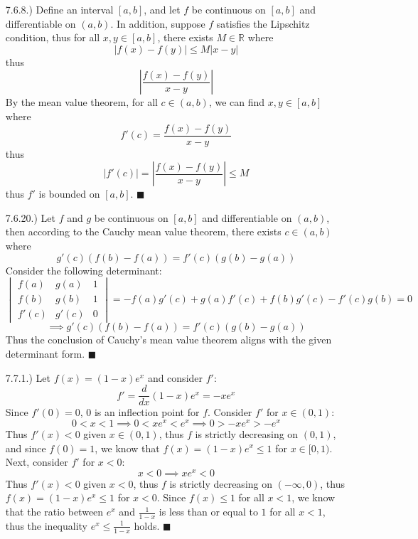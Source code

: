 \documentclass[11pt]{article}
\newcommand{\vertb}[1]{\left\vert#1\right\vert}      %
\newcommand{\parens}[1]{\left(#1\right)}             %
\newcommand{\R}{\mathbb{R}}
\newcommand{\derv}[2]{\dfrac{d#1}{d#2}}
\begin{document}
\pagestyle{fancy}
\fancyhead{}

\normalsize

\begin{itemize}
    \item [7.6.8.)] Define an interval $[a,b]$, and let $f$ be continuous on $[a,b]$ and differentiable on $(a,b)$. In addition, suppose $f$ satisfies the Lipschitz condition, thus for all $x,y\in[a,b]$, there exists $M\in\R$ where
    \[\vertb{f(x)-f(y)}\leq M\vertb{x-y}\]
    thus
    \[\vertb{\frac{f(x)-f(y)}{x-y}}\]
    By the mean value theorem, for all $c\in(a,b)$, we can find $x,y\in[a,b]$ where
    \[f'(c)=\frac{f(x)-f(y)}{x-y}\]
    thus
    \[\vertb{f'(c)}=\vertb{\frac{f(x)-f(y)}{x-y}}\leq M\]
    thus $f'$ is bounded on $[a,b]$. $\blacksquare$

    \item [7.6.20.)] Let $f$ and $g$ be continuous on $[a,b]$ and differentiable on $(a,b)$, then according to the Cauchy mean value theorem, there exists $c\in(a,b)$ where
    \[g'(c)(f(b)-f(a))=f'(c)(g(b)-g(a))\]
    Consider the following determinant:
    \[\begin{vmatrix*}
        f(a) & g(a) & 1 \\
        f(b) & g(b) & 1 \\
        f'(c) & g'(c) & 0
    \end{vmatrix*}=-f(a)g'(c)+g(a)f'(c)+f(b)g'(c)-f'(c)g(b)=0\]
    \[\implies g'(c)\parens{f(b)-f(a)}=f'(c)(g(b)-g(a))\]
    Thus the conclusion of Cauchy's mean value theorem aligns with the given determinant form. $\blacksquare$

    \item [7.7.1.)] Let $f(x)=(1-x)e^x$ and consider $f'$:
    \[f'=\derv{}{x}(1-x)e^x=-xe^x\]
    Since $f'(0)=0$, $0$ is an inflection point for $f$. Consider $f'$ for $x\in(0,1)$:
    \[0<x<1\implies0<xe^x<e^x\implies0>-xe^x>-e^x\]
    Thus $f'(x)<0$ given $x\in(0,1)$, thus $f$ is strictly decreasing on $(0,1)$, and since $f(0)=1$, we know that $f(x)=(1-x)e^x\leq 1$ for $x\in[0,1)$. Next, consider $f'$ for $x<0$:
    \[x<0\implies xe^x<0\]
    Thus $f'(x)<0$ given $x<0$, thus $f$ is strictly decreasing on $(-\infty,0)$, thus $f(x)=(1-x)e^x\leq 1$ for $x<0$. Since $f(x)\leq1$ for all $x<1$, we know that the ratio between $e^x$ and $\frac{1}{1-x}$ is less than or equal to $1$ for all $x<1$, thus the inequality $e^x\leq\frac{1}{1-x}$ holds. $\blacksquare$
\end{itemize}
\end{document}
